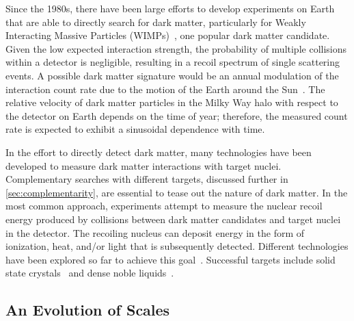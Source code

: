 Since the 1980s, there have been large efforts to develop experiments on Earth that are able to directly search for dark matter, particularly for Weakly Interacting Massive Particles (WIMPs)~\cite{Drukier:1983gj,Smith:1983jj,Goodman:1984dc,Drukier:1986tm}, one popular dark matter candidate. Given the low expected interaction strength, the probability of multiple collisions within a detector is negligible, resulting in a recoil spectrum of single scattering events. A possible dark matter signature would be an annual modulation of the interaction count rate due to the motion of the Earth around the Sun~\cite{Goodman:1984dc,Drukier:1986tm}. The relative velocity of dark matter particles in the Milky Way halo with respect to the detector on Earth depends on the time of year; therefore, the measured count rate is expected to exhibit a sinusoidal dependence with time.

In the effort to directly detect dark matter, many technologies have been developed to measure dark matter interactions with target nuclei. Complementary searches with different targets, discussed further in \autoref{sec:complementarity}, are essential to tease out the nature of dark matter. In the most common approach, experiments attempt to measure the nuclear recoil energy produced by collisions between dark matter candidates and target nuclei in the detector. The recoiling nucleus can deposit energy in the form of ionization, heat, and/or light that is subsequently detected. Different technologies have been explored so far to achieve this goal~\cite{Schumann:2019eaa}. Successful targets include solid state crystals~\cite{Aalseth:2014eft,Agnese:2014aze,Armengaud:2016cvl,Shields:2015wka,Aguilar-Arevalo:2016ndq,CRESST:2019jnq,Crisler:2018gci} and dense noble liquids~\cite{Aalseth:2018gq,Akerib:2016vxi,Aprile:2017aty,Cui:2017nnn,Kobayashi:2018jky,Amole:2017dex}. 

\subsection{An Evolution of Scales}\label{sec:evolution}

